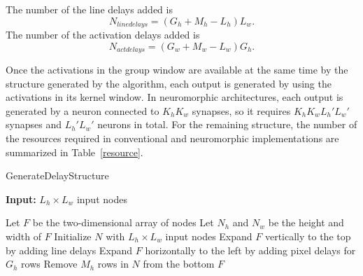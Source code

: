 \documentclass[journal]{IEEEtran}
\begin{document}
The number of the line delays added is
\begin{equation}
N_{linedelays} = (G_h+M_h-L_h)L_w.
\end{equation}
The number of the activation delays added is
\begin{equation}
N_{actdelays} = (G_w+M_w-L_w)G_h.
\end{equation}

Once the activations in the group window are available at the same time by the structure generated by the algorithm, each output is generated by using the activations in its kernel window. In neuromorphic architectures, each output is generated by a neuron connected to $K_hK_w$ synapses, so it requires $K_hK_wL_h'L_w'$ synapses and $L_h'L_w'$ neurons in total. For the remaining structure, the number of the resources required in conventional and neuromorphic implementations are summarized in Table~\ref{resource}. 

\begin{algorithm}\small                      %
\caption{GenerateDelayStructure}          %
\label{pgw}                           %
\textbf{Input:} {$L_h \times L_w$ input nodes}
\begin{algorithmic}[1]                    %

\STATE Let $F$ be the two-dimensional array of nodes
\STATE Let $N_h$ and $N_w$ be the height and width of $F$
\STATE Initialize $N$ with $L_h\times L_w$ input nodes
\STATE Expand $F$ vertically to the top by adding line delays 
\ENDWHILE
{}
\STATE Expand $F$ horizontally to the left by adding pixel delays for $G_h$ rows
\ENDWHILE
\STATE Remove $M_h$ rows in $N$ from the bottom
\RETURN $F$ 
\end{algorithmic}
\end{algorithm}
\end{document}
